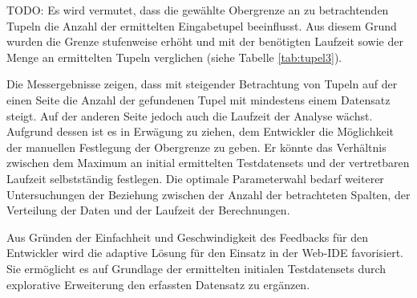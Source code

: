 TODO: Es wird vermutet, dass die gewählte Obergrenze an zu betrachtenden Tupeln die Anzahl der ermittelten Eingabetupel beeinflusst.
Aus diesem Grund wurden die Grenze stufenweise erhöht und mit der benötigten Laufzeit sowie der Menge an ermittelten Tupeln verglichen (siehe Tabelle \ref{tab:tupel3}).

\begin{table}[h]
	\centering
	\caption{Eingabetupel mit den meisten Ergebnissen}
	\label{tab:tupel3}
\end{table}

Die Messergebnisse zeigen, dass mit steigender Betrachtung von Tupeln auf der einen Seite die Anzahl der gefundenen Tupel mit mindestens einem Datensatz steigt.
Auf der anderen Seite jedoch auch die Laufzeit der Analyse wächst.
Aufgrund dessen ist es in Erwägung zu ziehen, dem Entwickler die Möglichkeit der manuellen Festlegung der Obergrenze zu geben.
Er könnte das Verhältnis zwischen dem Maximum an initial ermittelten Testdatensets und der vertretbaren Laufzeit selbstständig festlegen.
Die optimale Parameterwahl bedarf weiterer Untersuchungen der Beziehung zwischen der Anzahl der betrachteten Spalten, der Verteilung der Daten und der Laufzeit der Berechnungen.

Aus Gründen der Einfachheit und Geschwindigkeit des Feedbacks für den Entwickler wird die adaptive Lösung für den Einsatz in der Web-IDE favorisiert.
Sie ermöglicht es auf Grundlage der ermittelten initialen Testdatensets durch explorative Erweiterung den erfassten Datensatz zu ergänzen.






